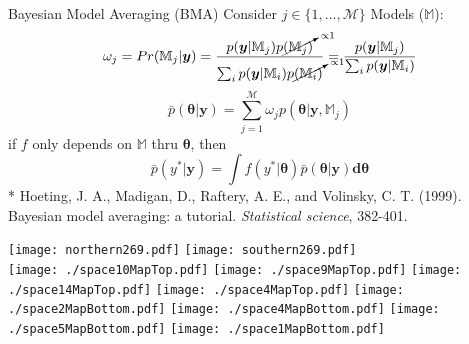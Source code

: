 \documentclass[ xcolor = pdftex, dvipsnames, table ]{beamer}
\begin{document}
%
\begin{frame}{Bayesian Model Averaging (BMA)}
      	Consider $j\in \{1, ..., \mathcal{M}\}$ Models ($\mathbb{M}$): %
      	\begin{equation*}
      	\omega_j = Pr(\mathbb{M}_j|\bm{y}) = \frac{ p(\bm{y}|\mathbb{M}_j)p\cancelto{\propto 1}{(\mathbb{M}_j)} }{ \sum_i p(\bm{y}|\mathbb{M}_i)p\cancelto{\propto 1}{(\mathbb{M}_i)}} = \frac{ p(\bm{y}|\mathbb{M}_j) }{ \sum_i p(\bm{y}|\mathbb{M}_i)}
	\end{equation*}
      	\begin{equation*}
      	\bar p(\bm{\theta}|\bm{y}) = \sum_{j=1}^{\mathcal{M}} \omega_j p(\bm{\theta}|\bm{y}, \mathbb{M}_j)
      	\end{equation*}
	\indent if $f$ only depends on $\mathbb{M}$ thru $\bm{\theta}$, then
      	\begin{equation*}
      	\bar p(y^*|\bm{y}) = \bm{\int} f(y^*|\bm{\theta}) \bar p(\bm{\theta}|\bm{y}) \bm{d\theta}
      	\end{equation*}
$~$\\
\fontsize{6pt}{7.2}\selectfont
* Hoeting, J. A., Madigan, D., Raftery, A. E., and Volinsky, C. T. (1999). Bayesian model averaging: a tutorial. \textit{Statistical science}, 382-401.

\end{frame}

%
%

%
\begin{frame}{}%
$~$\\
\hspace*{-1cm}
\texttt{[image: northern269.pdf]}
\texttt{[image: southern269.pdf]}\\
\vspace{-0.5cm}
\hspace*{-0.3cm}
\texttt{[image: ./space10MapTop.pdf]}
\texttt{[image: ./space9MapTop.pdf]}
\texttt{[image: ./space14MapTop.pdf]}
\texttt{[image: ./space4MapTop.pdf]}
\hspace*{0.9cm}
\texttt{[image: ./space2MapBottom.pdf]}
\texttt{[image: ./space4MapBottom.pdf]}
\texttt{[image: ./space5MapBottom.pdf]}
\texttt{[image: ./space1MapBottom.pdf]}
\end{frame}
\end{document}
